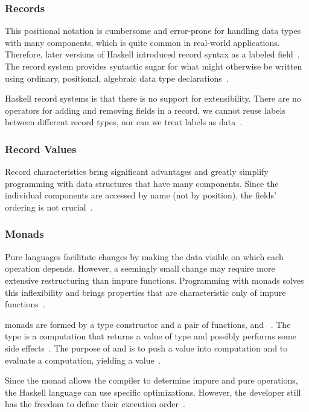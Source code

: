 \begin{frame}\frametitle{Records }
    
This positional notation is cumbersome and error-prone for handling data types with many components, which is quite common in real-world applications. Therefore, later versions of Haskell introduced record syntax as a labeled field~\cite{lw-ext-records, history-of-haskell}.
The record system provides syntactic sugar for what might otherwise be written using ordinary, positional, algebraic data type declarations~\cite{lw-ext-records}. 

Haskell record systems is that there is no support for extensibility. There are no operators for adding and removing fields in a record, we cannot reuse labels between different record types, nor can we treat labels as data~\cite{poly-ext-records, hlist,lw-ext-records}. 


\end{frame}

\begin{frame}\frametitle{Record Values}

Record characteristics bring significant advantages and greatly simplify programming with data structures that have many components. Since the individual components are accessed by name (not by position), the fields' ordering is not crucial~\cite{lw-ext-records}.


\end{frame}

\begin{frame}\frametitle{Monads}

Pure languages facilitate changes by making the data visible on which each operation depends. However, a seemingly small change may require more extensive restructuring than impure functions.  Programming with monads solves this inflexibility and brings properties that are characteristic only of impure functions~\cite{essence-of-fp}.

monads are formed by a type constructor  and a pair of functions, and \expr{>>=}~\cite{history-of-haskell,essence-of-fp}. The type  is a computation that returns a value of type  and possibly performs some side effects~\cite{history-of-haskell}. The purpose of  and \expr{>>=} is to push a value into computation and to evaluate a computation, yielding a value~\cite{essence-of-fp}.

Since the monad allows the compiler to determine impure and pure operations, the Haskell language can use specific optimizations. However, the developer still has the freedom to define their execution order~\cite{history-of-haskell}.

\end{frame}

